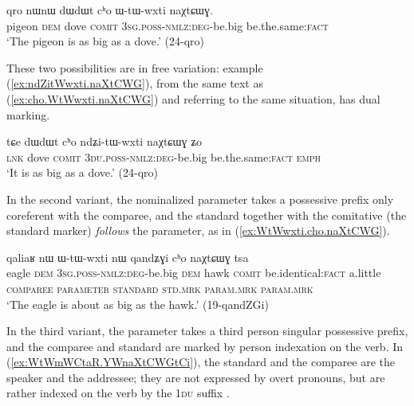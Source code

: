 \begin{exe} %
\ex \label{ex:cho.WtWwxti.naXtCWG}
\gll  qro nɯnɯ dɯdɯt cʰo ɯ-tɯ-wxti naχtɕɯɣ. \\
pigeon \textsc{dem} dove \textsc{comit} \textsc{3sg}.\textsc{poss}-\textsc{nmlz}:\textsc{deg}-be.big be.the.same:\textsc{fact} \\
\glt `The pigeon is as big as a dove.' (24-qro)
\end{exe}

These two possibilities are in free variation: example (\ref{ex:ndZitWwxti.naXtCWG}), from the same text as (\ref{ex:cho.WtWwxti.naXtCWG}) and referring to the same situation, has dual marking.

\begin{exe}
\ex \label{ex:ndZitWwxti.naXtCWG}
\gll tɕe  dɯdɯt cʰo ndʑi-tɯ-wxti naχtɕɯɣ ʑo \\
\textsc{lnk} dove \textsc{comit} \textsc{3du}.\textsc{poss}-\textsc{nmlz}:\textsc{deg}-be.big be.the.same:\textsc{fact} \textsc{emph} \\
\glt `It is as big as a dove.' (24-qro)
\end{exe}

In the second variant,  the nominalized parameter takes a possessive prefix only coreferent with the comparee, and the standard together with the comitative (the standard marker) \textit{follows} the parameter, as in (\ref{ex:WtWwxti.cho.naXtCWG}).

\begin{exe}
\ex \label{ex:WtWwxti.cho.naXtCWG}
\glll qaliaʁ nɯ ɯ-tɯ-wxti nɯ qandʑɣi cʰo naχtɕɯɣ tsa 	\\
eagle \textsc{dem} \textsc{3sg}.\textsc{poss}-\textsc{nmlz}:\textsc{deg}-be.big \textsc{dem} hawk \textsc{comit} \phantom{espace} be.identical:\textsc{fact} a.little  \\
{\textsc{comparee}} { } \textsc{parameter} { } {\textsc{standard}} \textsc{std}.\textsc{mrk} \phantom{espace} \textsc{param}.\textsc{mrk}  \textsc{param}.\textsc{mrk} \\
\glt `The eagle is about as big as the hawk.' (19-qandZGi)
\end{exe}

In the third variant, the parameter takes a third person singular possessive prefix, and the comparee and standard are marked by person indexation on the verb. In (\ref{ex:WtWmWCtaR.YWnaXtCWGtCi}), the standard and the comparee are the speaker and the addressee; they are not expressed by overt pronouns, but are rather indexed on the verb by the \textsc{1du} suffix .

